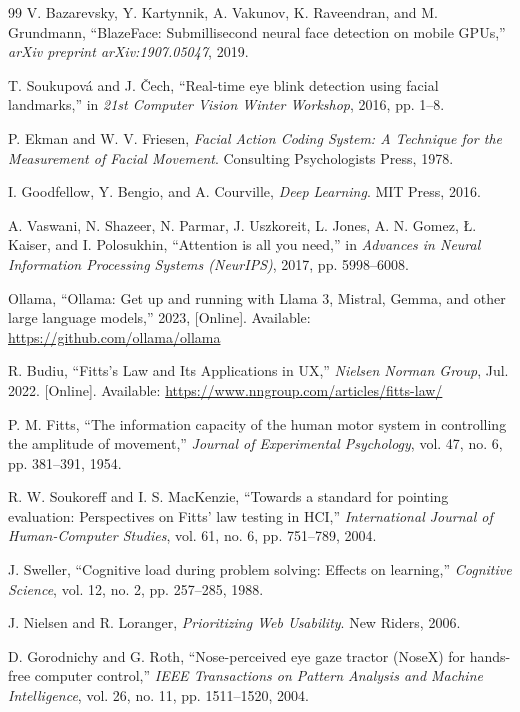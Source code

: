\documentclass[twoside, a4paper, 11pt]{article}
\begin{document}
\begin{thebibliography}{99}
V. Bazarevsky, Y. Kartynnik, A. Vakunov, K. Raveendran, and M. Grundmann, ``BlazeFace: Submillisecond neural face detection on mobile GPUs,'' \emph{arXiv preprint arXiv:1907.05047}, 2019.

T. Soukupov\'{a} and J. \v{C}ech, ``Real-time eye blink detection using facial landmarks,'' in \emph{21st Computer Vision Winter Workshop}, 2016, pp. 1--8.

P. Ekman and W. V. Friesen, \emph{Facial Action Coding System: A Technique for the Measurement of Facial Movement}. Consulting Psychologists Press, 1978.

I. Goodfellow, Y. Bengio, and A. Courville, \emph{Deep Learning}. MIT Press, 2016.

A. Vaswani, N. Shazeer, N. Parmar, J. Uszkoreit, L. Jones, A. N. Gomez, \L. Kaiser, and I. Polosukhin, ``Attention is all you need,'' in \emph{Advances in Neural Information Processing Systems (NeurIPS)}, 2017, pp. 5998--6008.

Ollama, ``Ollama: Get up and running with Llama 3, Mistral, Gemma, and other large language models,'' 2023, [Online]. Available: \url{https://github.com/ollama/ollama}

R. Budiu, ``Fitts's Law and Its Applications in UX,'' \emph{Nielsen Norman Group}, Jul. 2022. [Online]. Available: \url{https://www.nngroup.com/articles/fitts-law/}

P. M. Fitts, ``The information capacity of the human motor system in controlling the amplitude of movement,'' \emph{Journal of Experimental Psychology}, vol. 47, no. 6, pp. 381--391, 1954.

R. W. Soukoreff and I. S. MacKenzie, ``Towards a standard for pointing evaluation: Perspectives on Fitts' law testing in HCI,'' \emph{International Journal of Human-Computer Studies}, vol. 61, no. 6, pp. 751--789, 2004.

J. Sweller, ``Cognitive load during problem solving: Effects on learning,'' \emph{Cognitive Science}, vol. 12, no. 2, pp. 257--285, 1988.

J. Nielsen and R. Loranger, \emph{Prioritizing Web Usability}. New Riders, 2006.

D. Gorodnichy and G. Roth, ``Nose-perceived eye gaze tractor (NoseX) for hands-free computer control,'' \emph{IEEE Transactions on Pattern Analysis and Machine Intelligence}, vol. 26, no. 11, pp. 1511--1520, 2004.


\end{thebibliography}
\end{document}
